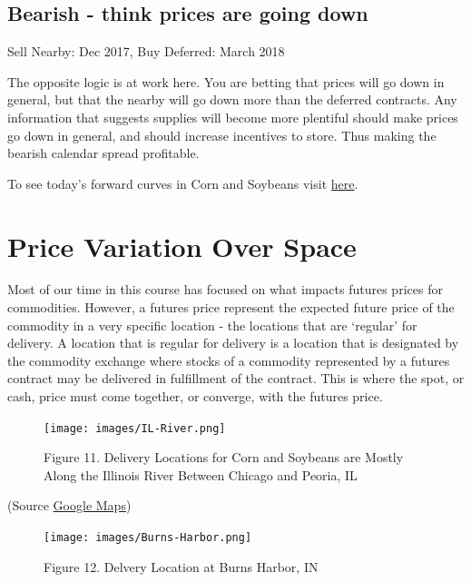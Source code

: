\documentclass[
  letterpaper,
  DIV=11,
  numbers=noendperiod]{scrreprt}
\begin{document}
\subsection{Bearish - think prices are going
down}\label{bearish---think-prices-are-going-down}

Sell Nearby: Dec 2017, Buy Deferred: March 2018

The opposite logic is at work here. You are betting that prices will go
down in general, but that the nearby will go down more than the deferred
contracts. Any information that suggests supplies will become more
plentiful should make prices go down in general, and should increase
incentives to store. Thus making the bearish calendar spread profitable.

To see today's forward curves in Corn and Soybeans visit
\href{https://mindymallory.shinyapps.io/ForwardCurves/}{here}.

\section{Price Variation Over Space}\label{price-variation-over-space}

Most of our time in this course has focused on what impacts futures
prices for commodities. However, a futures price represent the expected
future price of the commodity in a very specific location - the
locations that are `regular' for delivery. A location that is regular
for delivery is a location that is designated by the commodity exchange
where stocks of a commodity represented by a futures contract may be
delivered in fulfillment of the contract. This is where the spot, or
cash, price must come together, or converge, with the futures price.

\begin{figure}[H]

{\centering \texttt{[image: images/IL-River.png]}

}

\caption{Figure 11. Delivery Locations for Corn and Soybeans are Mostly
Along the Illinois River Between Chicago and Peoria, IL}

\end{figure}%

(Source \href{https://www.google.com/maps}{Google Maps})

\begin{figure}[H]

{\centering \texttt{[image: images/Burns-Harbor.png]}

}

\caption{Figure 12. Delvery Location at Burns Harbor, IN}

\end{figure}%
\end{document}
